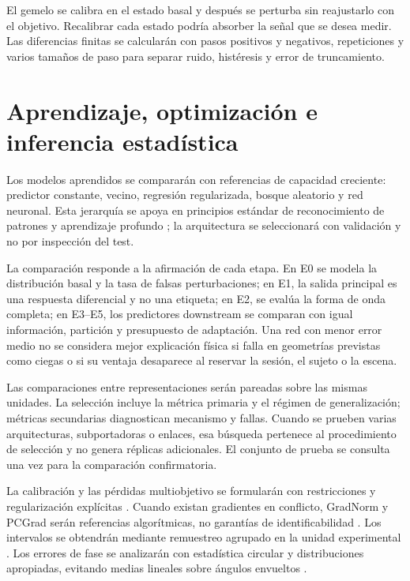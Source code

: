 El gemelo se calibra en el estado basal y después se perturba sin reajustarlo con el objetivo. Recalibrar cada estado podría absorber la señal que se desea medir. Las diferencias finitas se calcularán con pasos positivos y negativos, repeticiones y varios tamaños de paso para separar ruido, histéresis y error de truncamiento.

\section{Aprendizaje, optimización e inferencia estadística}

Los modelos aprendidos se compararán con referencias de capacidad creciente: predictor
constante, vecino, regresión regularizada, bosque aleatorio y red neuronal. Esta jerarquía
se apoya en principios estándar de reconocimiento de patrones y aprendizaje profundo
\citep{Bishop2006PRML,Breiman2001RandomForests,Goodfellow2016DL}; la arquitectura se
seleccionará con validación y no por inspección del test.

La comparación responde a la afirmación de cada etapa. En E0 se modela la distribución
basal y la tasa de falsas perturbaciones; en E1, la salida principal es una respuesta
diferencial y no una etiqueta; en E2, se evalúa la forma de onda completa; en E3--E5,
los predictores downstream se comparan con igual información, partición y presupuesto
de adaptación. Una red con menor error medio no se considera mejor explicación física
si falla en geometrías previstas como ciegas o si su ventaja desaparece al reservar la
sesión, el sujeto o la escena.

Las comparaciones entre representaciones serán pareadas sobre las mismas unidades.
La selección incluye la métrica primaria y el régimen de generalización; métricas
secundarias diagnostican mecanismo y fallas. Cuando se prueben varias arquitecturas,
subportadoras o enlaces, esa búsqueda pertenece al procedimiento de selección y no
genera réplicas adicionales. El conjunto de prueba se consulta una vez para la
comparación confirmatoria.

La calibración y las pérdidas multiobjetivo se formularán con restricciones y
regularización explícitas \citep{Boyd2004Convex}. Cuando existan gradientes en conflicto,
GradNorm y PCGrad serán referencias algorítmicas, no garantías de identificabilidad
\citep{Chen2018GradNorm,Yu2020PCGrad}. Los intervalos se obtendrán mediante remuestreo
agrupado en la unidad experimental \citep{Efron1993Bootstrap}. Los errores de fase se
analizarán con estadística circular y distribuciones apropiadas, evitando medias lineales
sobre ángulos envueltos \citep{Mardia2000Directional}.

